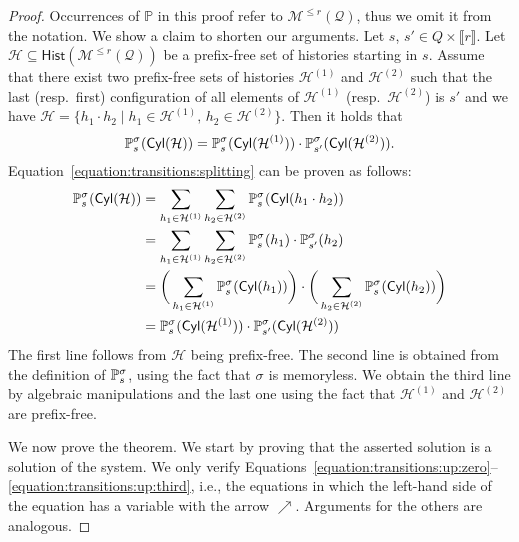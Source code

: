 \documentclass[a4paper,UKenglish,cleveref,autoref,thm-restate,colorlinks]{lipics-v2021}
\newcommand{\integerInterval}[1]{\llbracket{}#1\rrbracket{}}
\newcommand{\proba}{\mathbb{P}}
\newcommand{\cyl}[1]{\mathsf{Cyl}(#1)}
\newcommand{\mdp}{\mathcal{M}}
\newcommand{\histSet}[1]{\mathsf{Hist}(#1)}
\newcommand{\histPart}{\mathcal{H}}
\newcommand{\hist}{h}
\newcommand{\histConcat}[2]{#1\cdot{}#2}
\newcommand{\ocmdp}{\mathcal{Q}}
\newcommand{\ocmdpFin}[2]{\mdp^{\leq #2}(#1)}
\newcommand{\ocStateSpace}{Q}
\newcommand{\ocConfig}{s}
\newcommand{\counterUB}{r}
\newcommand{\stratGeneric}[1]{{\sigma_{#1}}}
\newcommand{\strat}{\stratGeneric{}}
\begin{document}
\begin{proof}
  Occurrences of $\proba$ in this proof refer to $\ocmdpFin{\ocmdp}{\counterUB}$, thus we omit it from the notation.
  We show a claim to shorten our arguments.
  Let $\ocConfig$, $\ocConfig'\in\ocStateSpace\times\integerInterval{\counterUB}$.
  Let $\histPart\subseteq\histSet{\ocmdpFin{\ocmdp}{\counterUB}}$ be a prefix-free set of histories starting in $\ocConfig$. Assume that there exist two prefix-free sets of histories $\histPart^{(1)}$ and $\histPart^{(2)}$ such that the last (resp.~first) configuration of all elements of $\histPart^{(1)}$ (resp.~$\histPart^{(2)}$) is $\ocConfig'$ and we have $\histPart = \{\histConcat{\hist_1}{\hist_2}\mid\hist_1\in\histPart^{(1)},\,\hist_2\in\histPart^{(2)}\}$.
  Then it holds that
  \begin{equation}\label{equation:transitions:splitting}
    \probaG{\ocConfig}{\strat}(\cyl{\histPart}) = \probaG{\ocConfig}{\strat}(\cyl{\histPart^{(1)}})\cdot\probaG{\ocConfig'}{\strat}(\cyl{\histPart^{(2)}}).
  \end{equation}
  Equation~\eqref{equation:transitions:splitting} can be proven as follows:
  \begin{align*}
    \probaG{\ocConfig}{\strat}(\cyl{\histPart})
    & = \sum_{\hist_1\in\histPart^{(1)}} \sum_{\hist_2\in\histPart^{(2)}}\probaG{\ocConfig}{\strat}(\cyl{\histConcat{\hist_1}{\hist_2}}) \\
    & = \sum_{\hist_1\in\histPart^{(1)}} \sum_{\hist_2\in\histPart^{(2)}}
      \probaG{\ocConfig}{\strat}(\hist_1)\cdot
      \probaG{\ocConfig'}{\strat}(\hist_2) \\
    & = \bigg(
      \sum_{\hist_1\in\histPart^{(1)}}
      \probaG{\ocConfig}{\strat}(\cyl{\hist_1})
      \bigg)\cdot
      \bigg(
      \sum_{\hist_2\in\histPart^{(2)}}
      \probaG{\ocConfig}{\strat}(\cyl{\hist_2})
      \bigg) \\
    & =\probaG{\ocConfig}{\strat}(\cyl{\histPart^{(1)}})\cdot
      \probaG{\ocConfig'}{\strat}(\cyl{\histPart^{(2)}})
  \end{align*}
  The first line follows from $\histPart$ being prefix-free.
  The second line is obtained from the definition of $\probaG{\ocConfig}{\strat}$, using the fact that $\strat$ is memoryless.
  We obtain the third line by algebraic manipulations and the last one using the fact that $\histPart^{(1)}$ and $\histPart^{(2)}$ are prefix-free.

  We now prove the theorem.
  We start by proving that the asserted solution is a solution of the system.
  We only verify Equations~\eqref{equation:transitions:up:zero}--\eqref{equation:transitions:up:third}, i.e., the equations in which the left-hand side of the equation has a variable with the arrow $\nearrow$.
  Arguments for the others are analogous.
  

\end{proof}
\end{document}
